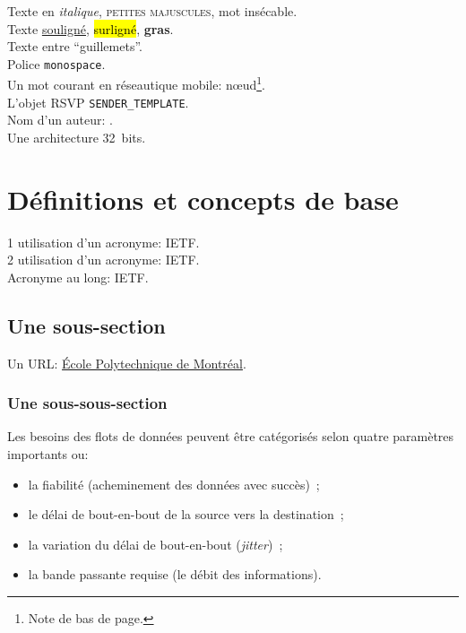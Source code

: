 \label{sec:Introduction}  %
Texte en \emph{italique}, \textsc{petites majuscules}, mot \mbox{insécable}.\\
Texte \ul{souligné}, \hl{surligné}, \textbf{gras}.\\
Texte entre ``guillemets''.\\
Police \texttt{monospace}.\\
Un mot courant en réseautique mobile: n\oe{}ud\footnote{Note de bas de page.}.\\
L'objet RSVP \texttt{SENDER\_TEMPLATE}.\\
Nom d'un auteur: \citeauthor{RFC_IPv4}.\\
Une architecture 32~bits.\\
\section{Définitions et concepts de base}  %
\begin{flushleft}
1\iere{} utilisation d'un acronyme: \ac{IETF}.\\
2\ieme{} utilisation d'un acronyme: \ac{IETF}.\\
Acronyme au long: \acl{IETF}.\\
\end{flushleft}

\subsection{Une sous-section}
Un URL: \href{http://www.polymtl.ca}{École Polytechnique de Montréal}.

\subsubsection{Une sous-sous-section}
Les besoins des flots de données peuvent être catégorisés selon
quatre paramètres importants \citep[voir][sect.\,5.4]{Tanenbaum} ou:
\begin{itemize}
\item la fiabilité (acheminement des données avec succès)~;
\item le délai de \mbox{bout-en-bout} de la source vers la destination~;
\item la variation du délai de \mbox{bout-en-bout} (\emph{jitter})~;
\item la bande passante requise (le débit des informations).
\end{itemize}

